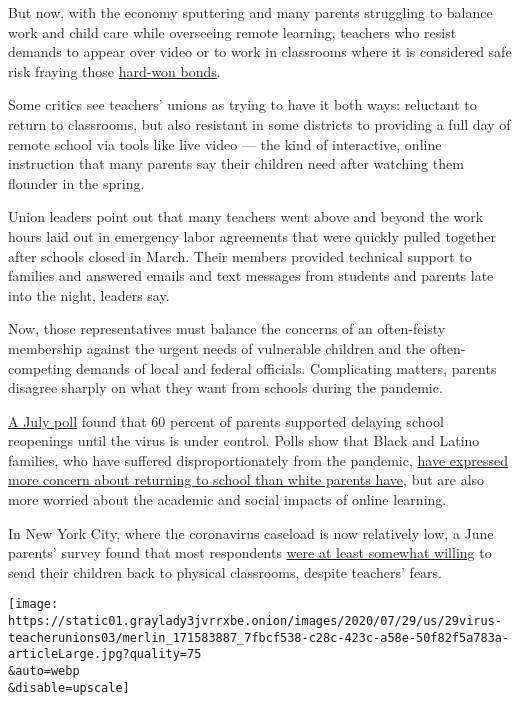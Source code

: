 But now, with the economy sputtering and many parents struggling to
balance work and child care while overseeing remote learning, teachers
who resist demands to appear over video or to work in classrooms where
it is considered safe risk fraying those
\href{https://www.nytimes3xbfgragh.onion/2020/07/11/us/virus-teachers-classrooms.html}{hard-won
bonds}.

Some critics see teachers' unions as trying to have it both ways:
reluctant to return to classrooms, but also resistant in some districts
to providing a full day of remote school via tools like live video ---
the kind of interactive, online instruction that many parents say their
children need after watching them flounder in the spring.

Union leaders point out that many teachers went above and beyond the
work hours laid out in emergency labor agreements that were quickly
pulled together after schools closed in March. Their members provided
technical support to families and answered emails and text messages from
students and parents late into the night, leaders say.

Now, those representatives must balance the concerns of an often-feisty
membership against the urgent needs of vulnerable children and the
often-competing demands of local and federal officials. Complicating
matters, parents disagree sharply on what they want from schools during
the pandemic.

\href{https://www.kff.org/coronavirus-covid-19/report/kff-health-tracking-poll-july-2020/}{A
July poll} found that 60 percent of parents supported delaying school
reopenings until the virus is under control. Polls show that Black and
Latino families, who have suffered disproportionately from the pandemic,
\href{https://www.chalkbeat.org/2020/7/14/21324873/school-closure-reopening-parents-surveys}{have
expressed more concern about returning to school than white parents
have}, but are also more worried about the academic and social impacts
of online learning.

In New York City, where the coronavirus caseload is now relatively low,
a June parents' survey found that most respondents
\href{https://www.nytimes3xbfgragh.onion/2020/07/06/nyregion/nyc-school-reopening-plan.html}{were
at least somewhat willing} to send their children back to physical
classrooms, despite teachers' fears.

\texttt{[image: https://static01.graylady3jvrrxbe.onion/images/2020/07/29/us/29virus-teacherunions03/merlin\_171583887\_7fbcf538-c28c-423c-a58e-50f82f5a783a-articleLarge.jpg?quality=75\\\&auto=webp\\\&disable=upscale]}


